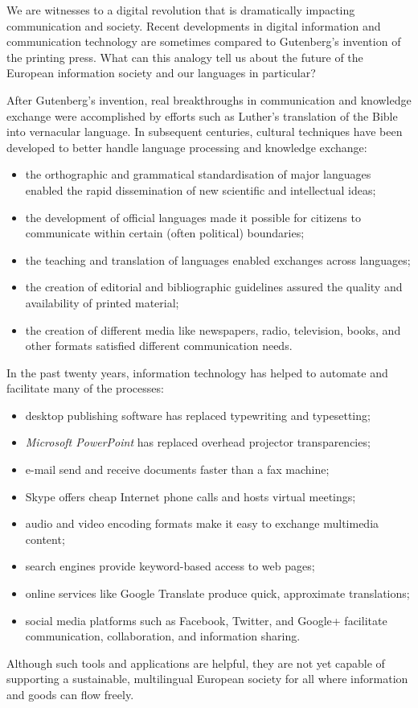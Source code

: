\begin{multicols}{2}

    We are witnesses to a digital revolution that is dramatically impacting communication and society. Recent developments in digital information and communication technology are sometimes compared to Gutenberg’s invention of the printing press. What can this analogy tell us about the future of the European information society and our languages in particular?

    After Gutenberg’s invention, real breakthroughs in communication and knowledge exchange were accomplished by efforts such as Luther’s translation of the Bible into vernacular language. In subsequent centuries, cultural techniques have been developed to better handle language processing and knowledge exchange:
    \begin{itemize}
      \item the orthographic and grammatical standardisation of major languages enabled the rapid dissemination of new 
      scientific and intellectual ideas;
      \item the development of official languages made it possible for citizens to communicate within certain (often 
      political) boundaries;
      \item the teaching and translation of languages enabled exchanges across languages;
      \item the creation of editorial and bibliographic guidelines assured the quality and availability of printed 
      material;
      \item the creation of different media like newspapers, radio, television, books, and other formats satisfied 
      different communication needs. 
    \end{itemize}
    In the past twenty years, information technology has helped to automate and facilitate many of the processes:
    \begin{itemize}
      \item desktop publishing software has replaced typewriting and typesetting;
      \item \textit{Microsoft PowerPoint} has replaced overhead projector transparencies;
      \item e-mail send and receive documents faster than a fax machine;
      \item Skype offers cheap Internet phone calls and hosts virtual meetings;
      \item audio and video encoding formats make it easy to exchange multimedia content;
      \item search engines provide keyword-based access to web pages;
      \item online services like Google Translate produce quick, approximate translations;
      \item social media platforms such as Facebook, Twitter, and Google+ facilitate communication, collaboration, and information sharing.
    \end{itemize}
    Although such tools and applications are helpful, they are not yet capable of supporting a sustainable, multilingual European society for all where information and goods can flow freely.


\end{multicols}
